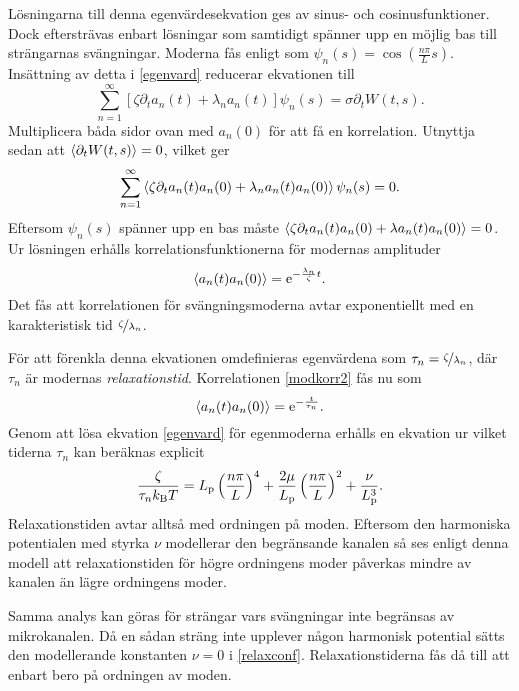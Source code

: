 Lösningarna till denna egenvärdesekvation ges av sinus- och cosinusfunktioner. Dock eftersträvas enbart lösningar som samtidigt spänner upp en möjlig bas till strängarnas svängningar. Moderna fås enligt \cite{Harnau&Reineker1999} som $\psi_{n}(s)=\cos\left({\frac{n\pi}{L}s}\right)$. Insättning av detta i \eqref{egenvard} reducerar ekvationen till
\begin{equation}
    \sum_{n=1}^{\infty}\left[
    \zeta\partial_{t}a_{n}(t)+\lambda_{n} a_{n}(t)
    \right]\psi_{n}(s)=\sigma\partial_{t}W(t,s).
\end{equation}
Multiplicera båda sidor ovan med $a_n(0)$ för att få en korrelation. Utnyttja sedan att $\ev{\partial_{t}W(t,s)}=0$, vilket ger
\begin{equation}
    \sum_{n=1}^{\infty}\ev{\zeta\partial_{t}a_{n}(t)a_n(0)+\lambda_{n}a_{n}(t)a_n(0)}\psi_{n}(s)=0.
\end{equation}
Eftersom $\psi_{n}(s)$ spänner upp en bas måste $\ev{\zeta\partial_{t}a_{n}(t)a_{n}(0)+\lambda a_{n}(t)a_{n}(0)}=0$. Ur lösningen erhålls korrelationsfunktionerna för modernas amplituder
\begin{equation}
\label{modkorr2}
    \ev{a_{n}(t)a_{n}(0)}=\ee^{-\frac{\lambda_{n}}{\zeta}t}.
\end{equation}
Det fås att korrelationen för svängningsmoderna avtar exponentiellt med en karakteristisk tid $\nicefrac{\zeta}{\lambda_{n}}$. 

För att förenkla denna ekvationen omdefinieras egenvärdena som $\tau_n=\nicefrac{\zeta}{\lambda_n}$, där $\tau_{n}$ är modernas \emph{relaxationstid}. Korrelationen \eqref{modkorr2} fås nu som
\begin{equation}\label{modkorr}
\ev{a_{n}(t)a_{n}(0)}=\ee^{-\frac{t}{\tau_{n}}}.
\end{equation}
Genom att lösa ekvation \eqref{egenvard} för egenmoderna erhålls en ekvation ur vilket tiderna $\tau_{n}$ kan beräknas explicit
\begin{equation}\label{relaxconf}
    \frac{\zeta}{\tau_{n}k_{\text{B}}T}=L_{\text{p}}\left(\frac{n\pi}{L}\right)^{4}+\frac{2\mu}{L_{\text{p}}}\left(\frac{n\pi}{L}\right)^{2}+\frac{\nu}{L_{\text{p}}^3}.
\end{equation}
Relaxationstiden avtar alltså med ordningen på moden. Eftersom den harmoniska potentialen med styrka $\nu$ modellerar den begränsande kanalen så ses enligt denna modell att relaxationstiden för högre ordningens moder påverkas mindre av kanalen än lägre ordningens moder. 

Samma analys kan göras för strängar vars svängningar inte begränsas av mikrokanalen. Då en sådan sträng inte upplever någon harmonisk potential sätts den modellerande konstanten $\nu=0$ i \eqref{relaxconf}. Relaxationstiderna fås då till att enbart bero på ordningen av moden. 



